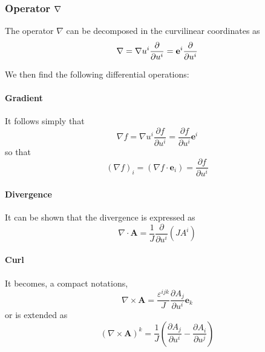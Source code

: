 \subsubsection{Operator $\protect\nabla$}

The operator $\nabla$ can be decomposed in the curvilinear coordinates as 
\begin{equation}
\nabla=\nabla u^{i}\frac{\partial}{\partial u^{i}}=\mathbf{e}^{i}\frac{%
\partial}{\partial u^{i}}
\end{equation}

We then find the following differential operations:

\paragraph{Gradient}

It follows simply that 
\begin{equation}
\nabla f=\nabla u^{i}\frac{\partial f}{\partial u^{i}}=\frac{\partial f}{
\partial u^{i}}\mathbf{e}^{i}
\end{equation}
so that 
\begin{equation}
\left( \nabla f\right) _{i}=\left( \nabla f\cdot\mathbf{e}_{i}\right) =\frac{
\partial f}{\partial u^{i}}
\end{equation}

\paragraph{Divergence}

It can be shown that the divergence is expressed as 
\begin{equation}
\nabla\cdot\mathbf{A}=\frac{1}{J}\frac{\partial}{\partial u^{i}}\left(
JA^{i}\right)  \label{div1}
\end{equation}

\paragraph{Curl}

It becomes, a compact notations, 
\begin{equation}
\nabla\times\mathbf{A}=\frac{\varepsilon^{ijk}}{J}\frac{\partial A_{j}}{
\partial u^{i}}\mathbf{e}_{k}
\end{equation}
or is extended as 
\begin{equation}
\left( \nabla\times\mathbf{A}\right) ^{k}=\frac{1}{J}\left( \frac{\partial
A_{j}}{\partial u^{i}}-\frac{\partial A_{i}}{\partial u^{j}}\right)
\end{equation}

